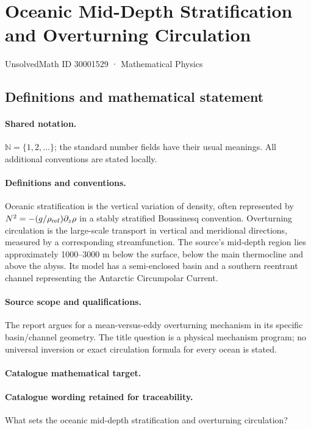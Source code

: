 \documentclass[11pt]{article}
\begin{document}
\setcounter{section}{30001528}
\section{Oceanic Mid-Depth Stratification and Overturning Circulation}\label{30001529}
{\small UnsolvedMath ID 30001529 · Mathematical Physics}
\subsection{Definitions and mathematical statement}

\paragraph{Shared notation.}$\mathbb N=\{1,2,\ldots\}$; the standard number fields have their usual meanings. All additional conventions are stated locally.


\paragraph{Definitions and conventions.} Oceanic stratification is the vertical variation of density, often represented by $N^2=-(g/\rho_{\rm ref})\partial_z\rho$ in a stably stratified Boussinesq convention. Overturning circulation is the large-scale transport in vertical and meridional directions, measured by a corresponding streamfunction. The source's mid-depth region lies approximately 1000--3000 m below the surface, below the main thermocline and above the abyss. Its model has a semi-enclosed basin and a southern reentrant channel representing the Antarctic Circumpolar Current.

\paragraph{Source scope and qualifications.} The report argues for a mean-versus-eddy overturning mechanism in its specific basin/channel geometry. The title question is a physical mechanism program; no universal inversion or exact circulation formula for every ocean is stated.

\paragraph{Catalogue mathematical target.}
\paragraph{Catalogue wording retained for traceability.}
What sets the oceanic mid-depth stratification and overturning circulation?
\end{document}
